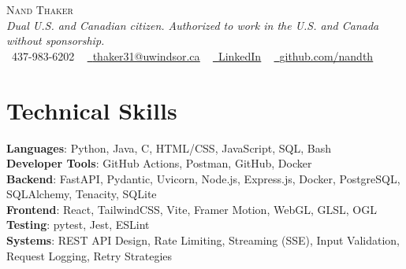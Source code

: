 \documentclass[letterpaper,11pt]{article}
\begin{document}

\begin{center}
    {\Huge \scshape Nand Thaker} \\ \vspace{2pt}
    {\small \textit{Dual U.S. and Canadian citizen. Authorized to work in the U.S. and Canada without sponsorship.}} \\ \vspace{4pt}
    \small \raisebox{-0.1\height}\faPhone\ 437-983-6202 ~ 
    \href{mailto:thaker31@uwindsor.ca}{\raisebox{-0.2\height}\faEnvelope\ \underline{thaker31@uwindsor.ca}} ~ 
    \href{https://www.linkedin.com/in/nand-thaker-b919482aa/}{\raisebox{-0.2\height}\faLinkedin\ \underline{LinkedIn}} ~
    \href{https://github.com/nandth}{\raisebox{-0.2\height}\faGithub\ \underline{github.com/nandth}}
    \vspace{-8pt}
\end{center}


\section{Technical Skills}
 \begin{itemize}[leftmargin=0, label={}]
    \small{\item{
     \textbf{Languages}{: Python, Java, C, HTML/CSS, JavaScript, SQL, Bash} \\
     \textbf{Developer Tools}{: GitHub Actions, Postman, GitHub, Docker} \\
     \textbf{Backend}{: FastAPI, Pydantic, Uvicorn, Node.js, Express.js, Docker, PostgreSQL, SQLAlchemy, Tenacity, SQLite} \\
     \textbf{Frontend}{: React, TailwindCSS, Vite, Framer Motion, WebGL, GLSL, OGL} \\
     \textbf{Testing}{: pytest, Jest, ESLint} \\
     \textbf{Systems}{: REST API Design, Rate Limiting, Streaming (SSE), Input Validation, Request Logging, Retry Strategies} \\
    }}
 \end{itemize}
\end{document}
